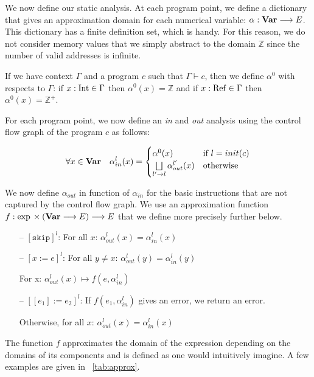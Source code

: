 We now define our static analysis.
At each program point, we define a dictionary that gives an approximation domain for each numerical variable: $\alpha: \mathbf{Var}{} \longrightarrow E$.
This dictionary has a finite definition set, which is handy.
For this reason, we do not consider memory values that we simply abstract to the domain $\mathbb{Z}$ since the number of valid addresses is infinite.

If we have context $\Gamma$ and a program $c$ such that $\Gamma \vdash c$, then we define $\alpha^0$ with respects to $\Gamma$:
if $x: \mathrm{Int} \in \Gamma$ then $\alpha^0(x) = \mathbb{Z}$ and if $x: \mathrm{Ref} \in \Gamma$ then $\alpha^0(x) = \mathbb{Z}^{+}$.

For each program point, we now define an \emph{in} and \emph{out} analysis using the control flow graph of the program $c$ as follows:

\[
\forall x \in \mathbf{Var}{} \quad \alpha_{in}^l(x) =
	\begin{cases}
		\alpha^0(x) & \text{if $l = init(c)$} \\
		\bigsqcup\limits_{l' \rightarrow l} \alpha_{out}^{l'}(x) & \text{otherwise} \\
	\end{cases}
\]

We now define $\alpha_{out}$ in function of $\alpha_{in}$ for the basic instructions that are not captured by the control flow graph.
We use an approximation function $f: \exp{} \times (\mathbf{Var}{} \longrightarrow E) \longrightarrow E$ that we define more precisely further below.

\begin{itemize}
	\itemsep0em
	\item[--] $\left[\texttt{skip}\right]^l$: For all $x$: $\alpha_{out}^l(x) = \alpha_{in}^l(x)$
	\item[--] $\left[x := e\right]^l$: For all $y \neq x$: $\alpha_{out}^l(y) = \alpha_{in}^l(y)$
	
	For x: $\alpha_{out}^l(x) \mapsto f(e, \alpha_{in}^l)$
	\item[--] $\left[[e_1] := e_2\right]^l$: If $f(e_1, \alpha_{in}^l)$ gives an error, we return an error.
	
	Otherwise, for all $x$: $\alpha_{out}^l(x) = \alpha_{in}^l(x)$
\end{itemize}

The function $f$ approximates the domain of the expression depending on the domains of its components and is defined as one would intuitively imagine.
A few examples are given in \tablename~\ref{tab:approx}.

